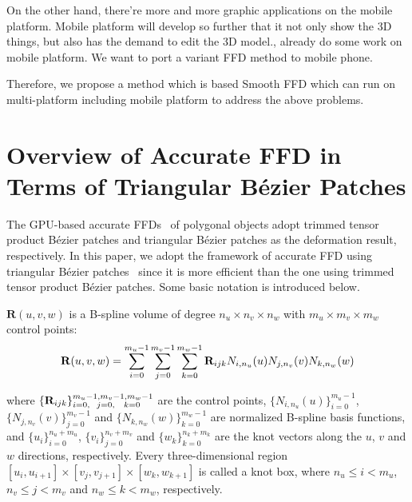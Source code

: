 \documentclass[3p]{elsarticle}
\begin{document}
On the other hand, there're more and more graphic applications on the mobile platform. Mobile platform will develop so further that it not only show the 3D things, but also has the demand to edit the 3D model.\cite{mobile1}, \cite{mobile2} already do some work on mobile platform. We want to port a variant FFD method to mobile phone.

Therefore, we propose a method which is based Smooth FFD which can run on multi-platform including mobile platform to address the above problems.


\section{Overview of Accurate FFD in Terms of Triangular B\'ezier Patches}

The GPU-based accurate FFDs~\cite{Cui13, Cui14} of polygonal objects adopt trimmed tensor product B\'ezier patches and
triangular B\'ezier patches as the deformation result, respectively. In this paper, we adopt the framework of accurate
FFD using triangular B\'ezier patches~\cite{Feng98, Feng00, Cui14} since it is more efficient than the one using trimmed
tensor product B\'ezier patches. Some basic notation is introduced below.

$\mathbf R(u,v,w)$ is a B-spline volume of degree $n_u\times n_v\times n_w$ with $m_u\times m_v\times m_w$ control
points:
\begin{equation}
	\footnotesize
	{\mathbf R}(u,v,w) 
	= \sum_{i=0}^{m_u-1}\sum_{j=0}^{m_v-1}\sum_{k=0}^{m_w-1} {\mathbf
	R}_{ijk}N_{i,n_u}(u)N_{j,n_v}(v)N_{k,n_w}(w)
	\label{equ:Ruvw}
\end{equation}

\noindent where $\{\mathbf R_{ijk}\}_{i=0,\hspace{6 pt} j=0,\hspace{8 pt} k=0}^{m_u-1,m_v-1,m_w-1}$ are the control
points, $\{N_{i,n_u}(u)\}_{i=0}^{m_u-1}$, $\{N_{j,n_v}(v)\}_{j=0}^{m_v-1}$ and $\{N_{k,n_w}(w)\}_{k=0}^{m_w-1}$ are
normalized B-spline basis functions, and $\{u_i\}^{n_u+m_u}_{i=0}$, $\{v_i\}^{n_v+m_v}_{j=0}$ and
$\{w_k\}^{n_k+m_k}_{k=0}$ are the knot vectors along the $u$, $v$ and $w$ directions, respectively. Every
three-dimensional region $[u_i, u_{i+1}] \times [v_j, v_{j+1}] \times [w_k, w_{k+1}]$ is called a knot box, where
$n_u\leq i < m_u$, $n_v\leq j < m_v$ and $n_w\leq k < m_w$, respectively.
\end{document}
